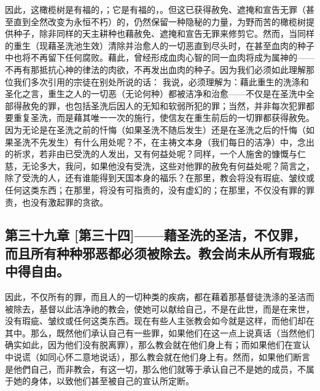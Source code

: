 因此，这橄榄树是有福的，；它是有福的，。但这已获得赦免、遮掩和宣告无罪（甚至直到全然改变为永恒不朽）的，仍然保留一种隐秘的力量，为野而苦的橄榄树提供种子，除非同样的天主耕种也藉赦免、遮掩和宣告无罪来修剪它。然而，当同样的重生（现藉圣洗池生效）清除并治愈人的一切恶直到尽头时，在甚至血肉的种子中也将不再留下任何腐败。藉此，曾经形成血肉心智的同一血肉将成为属神的——不再有那抵抗心神的律法的肉欲，不再发出血肉的种子。因为我们必须如此理解那位我们多次引用的宗徒在别处所说的话：  我说，必须理解为：藉此重生的洗涤和圣化之言，重生之人的一切恶（无论何种）都被洁净和治愈——不仅是在圣洗中全部得赦免的罪，也包括圣洗后因人的无知和软弱所犯的罪；当然，并非每次犯罪都要重复圣洗，而是藉其唯一一次的施行，使信友在重生前后的一切罪都获得赦免。因为无论是在圣洗之前的忏悔（如果圣洗不随后发生）还是在圣洗之后的忏悔（如果圣洗不先发生）有什么用处呢？不，在主祷文本身（我们每日的洁净）中，念出  的祈求，若非由已受洗的人发出，又有何益处呢？同样，一个人施舍的慷慨与仁慈，无论多大，我问，如果他没有受洗，这些对他罪的赦免有何益处呢？简言之，除了受洗的人，还有谁能得到天国本身的福乐？在那里，教会将没有瑕疵、皱纹或任何这类东西；在那里，将没有可指责的，没有虚幻的；在那里，不仅没有罪的罪责，也没有激起罪的贪欲。\par


\subsection{第三十九章 [第三十四]——藉圣洗的圣洁，不仅罪，而且所有种种邪恶都必须被除去。教会尚未从所有瑕疵中得自由。}

因此，不仅所有的罪，而且人的一切种类的疾病，都在藉着那基督徒洗涤的圣洁而被除去，基督以此洁净祂的教会，使她可以献给自己，不是在此世，而是在来世，没有瑕疵、皱纹或任何这类东西。现在有些人主张教会如今就是这样，而他们却在其中。那么，既然他们承认自己有一些罪，如果他们在这一点上说真话（当然他们确实如此，因为他们没有脱离罪），那么教会就在他们身上有；而如果他们在宣认中说谎（如同心怀二意地说话），那么教会就在他们身上有。然而，如果他们断言是他們自己，而非教会，有这一切，那么他们就等于承认自己不是她的成员，不属于她的身体，以致他们甚至被自己的宣认所定断。\par

